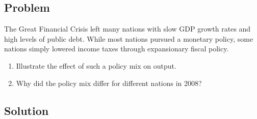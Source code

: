 \documentclass[12pt]{article}
\begin{document}
\subsection*{Problem}
The Great Financial Crisis left many nations with slow GDP growth rates and high levels of public debt. While most nations pursued a monetary policy, some nations simply lowered income taxes through expansionary fiscal policy.
\begin{enumerate}[label=(\alph*)]
  \item Illustrate the effect of such a policy mix on output.
  \item Why did the policy mix differ for different nations in 2008?
\end{enumerate}

\subsection*{Solution}
\end{document}
